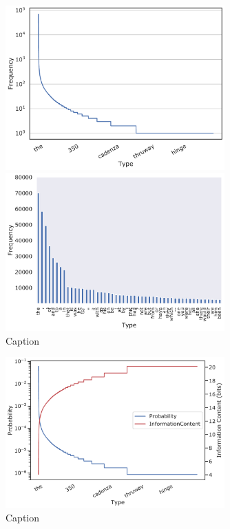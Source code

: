\begin{figure}[ht]
    \centering
    \includegraphics[width=0.75\textwidth]{img/background/brown-corpus-zipf.pdf}
    
    \includegraphics[width=0.75\textwidth]{img/background/brown-corpus-zipf-top50.pdf}
    \caption{Caption}
    \label{fig:my_label}
\end{figure}
\begin{figure}[ht]
    \centering
    \includegraphics[width=0.75\textwidth, trim={3mm 0 3mm 0}, clip] {img/background/brown-corpus-shannons.pdf}
    \caption{Caption}
    \label{fig:my_label}
\end{figure}


